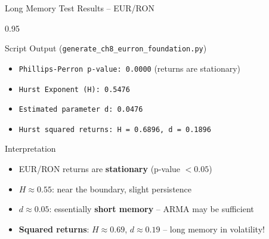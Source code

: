 \documentclass[9pt, aspectratio=169, t]{beamer}
\begin{document}
\begin{frame}{Long Memory Test Results -- EUR/RON}
    \begin{cminipage}{0.95\textwidth}
    \begin{block}{Script Output (\texttt{generate\_ch8\_eurron\_foundation.py})}
        {\footnotesize
        \begin{itemize}\setlength{\itemsep}{0pt}
            \item \texttt{Phillips-Perron p-value: 0.0000} (returns are stationary)
            \item \texttt{Hurst Exponent (H): 0.5476}
            \item \texttt{Estimated parameter d: 0.0476}
            \item \texttt{Hurst squared returns: H = 0.6896, d = 0.1896}
        \end{itemize}
        }
    \end{block}

    \vspace{0.2cm}

    \begin{alertblock}{Interpretation}
        \begin{itemize}\setlength{\itemsep}{0pt}
            \item EUR/RON returns are \textbf{stationary} (p-value $< 0.05$)
            \item $H \approx 0.55$: near the boundary, slight persistence
            \item $d \approx 0.05$: essentially \textbf{short memory} -- ARMA may be sufficient
            \item \textbf{Squared returns}: $H \approx 0.69$, $d \approx 0.19$ -- long memory in volatility!
        \end{itemize}
    \end{alertblock}
    \end{cminipage}
\end{frame}
\end{document}
